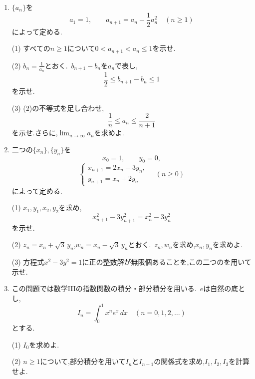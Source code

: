 \begin{enumerate}[label=\textbf{問\arabic*.},leftmargin=3.8em,format=\bookitemlink{practice-bridge}{problem}{hint}]
    \par\smallskip\noindent
    \par\smallskip\noindent
    (3) $x_n,y_n$のを求めよ.
  \item {}$\{a_n\}$を
    \[
      a_1=1,\qquad a_{n+1}=a_n-\frac12a_n^2
      \quad(n\ge1)
    \]
    によって定める.
    \par\smallskip\noindent
    (1) すべての$n\ge1$について$0<a_{n+1}<a_n\le1$を示せ.
    \par\smallskip\noindent
    (2) $b_n=\frac1{a_n}$とおく.\,
    $b_{n+1}-b_n$を$a_n$で表し,
    \[
      \frac12\le b_{n+1}-b_n\le1
    \]
    を示せ.
    \par\smallskip\noindent
    (3) (2)の不等式を足し合わせ,
    \[
      \frac1n\le a_n\le\frac2{n+1}
    \]
    を示せ.さらに,$\lim_{n\to\infty}a_n$を求めよ.
  \item 二つの$\{x_n\},\{y_n\}$を
    \[
      x_0=1,\qquad y_0=0,
    \]
    \[
      \begin{cases}
        x_{n+1}=2x_n+3y_n,\\
        y_{n+1}=x_n+2y_n
      \end{cases}
      \quad(n\ge0)
    \]
    によって定める.
    \par\smallskip\noindent
    (1) $x_1,y_1,x_2,y_2$を求め,
    \[
      x_{n+1}^2-3y_{n+1}^2=x_n^2-3y_n^2
    \]
    を示せ.
    \par\smallskip\noindent
    (2) $z_n=x_n+\sqrt3\,y_n$,$w_n=x_n-\sqrt3\,y_n$とおく.\,
    $z_n,w_n$を求め,$x_n,y_n$を求めよ.
    \par\smallskip\noindent
    (3) 方程式$x^2-3y^2=1$に正の整数解が無限個あることを,この二つのを用いて示せ.
  \item この問題では数学IIIの指数関数の積分・部分積分を用いる.\,
    $e$は自然の底とし,
    \[
      I_n=\int_0^1 x^n e^x\,dx
      \quad(n=0,1,2,\ldots)
    \]
    とする.
    \par\smallskip\noindent
    (1) $I_0$を求めよ.
    \par\smallskip\noindent
    (2) $n\ge1$について,部分積分を用いて$I_n$と$I_{n-1}$の関係式を求め,$I_1,I_2,I_3$を計算せよ.

\end{enumerate}
